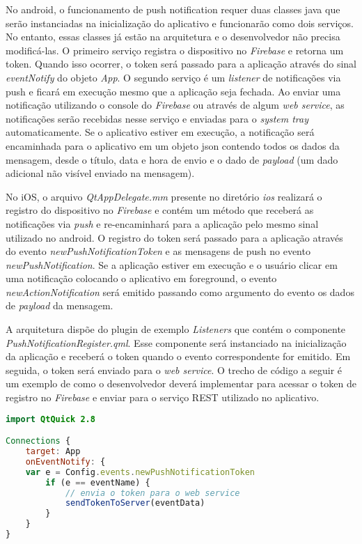 No android, o funcionamento de push notification requer duas classes java que serão instanciadas na inicialização do aplicativo e funcionarão como dois serviços. No entanto, essas classes já estão na arquitetura e o desenvolvedor não precisa modificá-las. O primeiro serviço registra o dispositivo no \textit{Firebase} e retorna um token. Quando isso ocorrer, o token será passado para a aplicação através do sinal \textit{eventNotify} do objeto \textit{App}. O segundo serviço é um \textit{listener} de notificações via push e ficará em execução mesmo que a aplicação seja fechada. Ao enviar uma notificação utilizando o console do \textit{Firebase} ou através de algum \textit{web service}, as notificações serão recebidas nesse serviço e enviadas para o \textit{system tray} automaticamente. Se o aplicativo estiver em execução, a notificação será encaminhada para o aplicativo em um objeto json contendo todos os dados da mensagem, desde o título, data e hora de envio e o dado de \textit{payload} (um dado adicional não visível enviado na mensagem).\par

No iOS, o arquivo \textit{QtAppDelegate.mm} presente no diretório \textit{ios} realizará o registro do dispositivo no \textit{Firebase} e contém um método que receberá as notificações via \textit{push} e re-encaminhará para a aplicação pelo mesmo sinal utilizado no android. O registro do token será passado para a aplicação através do evento \textit{newPushNotificationToken} e as mensagens de push no evento \textit{newPushNotification}. Se a aplicação estiver em execução e o usuário clicar em uma notificação colocando o aplicativo em foreground, o evento \textit{newActionNotification} será emitido passando como argumento do evento os dados de \textit{payload} da mensagem.\par

A arquitetura dispõe do plugin de exemplo \textit{Listeners} que contém o componente \textit{PushNotificationRegister.qml}. Esse componente será instanciado na inicialização da aplicação e receberá o token quando o evento correspondente for emitido. Em seguida, o token será enviado para o \textit{web service}. O trecho de código a seguir é um exemplo de como o desenvolvedor deverá implementar para acessar o token de registro no \textit{Firebase} e enviar para o serviço REST utilizado no aplicativo.

\begin{center}
\begin{lstlisting}[language=qml]
import QtQuick 2.8

Connections {
    target: App
    onEventNotify: {
	var e = Config.events.newPushNotificationToken
        if (e == eventName) {
            // envia o token para o web service
            sendTokenToServer(eventData)
        }
    }
}
\end{lstlisting}
\end{center}


